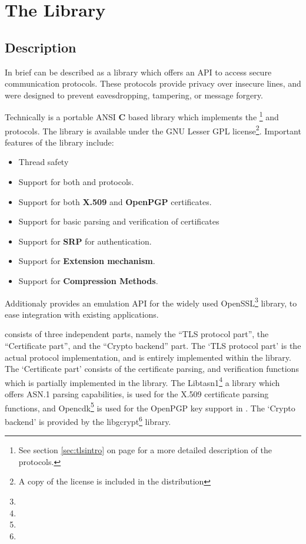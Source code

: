 \chapter{The Library}

\section{Description}
\par
In brief \gnutls{} can be described as a library which offers
an API to access secure communication protocols. These protocols provide
privacy over insecure lines, and were designed to prevent 
eavesdropping, tampering, or message forgery.

\par
Technically \gnutls{} is a portable ANSI {\bf C} based library which implements the 
\tlsI{}\footnote{See section \ref{sec:tlsintro} on page \pageref{sec:tlsintro} for
a more detailed description of the protocols.} and \sslIII{} protocols. 
The library is available under the GNU Lesser GPL license\footnote{A copy of the license is included
in the distribution}.
Important features of the \gnutls{} library include:

\begin{itemize}
\item Thread safety
\item Support for both \tlsI{} and \sslIII{} protocols.
\item Support for both {\bf X.509} and {\bf OpenPGP} certificates.
\item Support for basic parsing and verification of certificates
\item Support for {\bf SRP} for \tls{} authentication.
\item Support for \tls{} {\bf Extension mechanism}.
\item Support for \tls{} {\bf Compression Methods}.
\end{itemize}

Additionaly \gnutls{} provides an emulation API for the widely used
OpenSSL\footnote{} 
library, to ease integration with existing applications.

\par 
\gnutls{} consists of three
independent parts, namely the ``TLS protocol part'', the ``Certificate part'', and 
the ``Crypto backend'' part.
The `TLS protocol part' is the actual protocol implementation, and is entirely
implemented within the \gnutls{} library.
The `Certificate part' consists of the certificate parsing, and verification
functions which is partially implemented in the \gnutls{} library. The
Libtasn1\footnote{}
a library which offers ASN.1 parsing capabilities, is used for the
X.509 certificate parsing functions, and
Opencdk\footnote{}
is used for the OpenPGP key support in \gnutls{}.
The `Crypto backend' is provided by the 
libgcrypt\footnote{}
library. 

